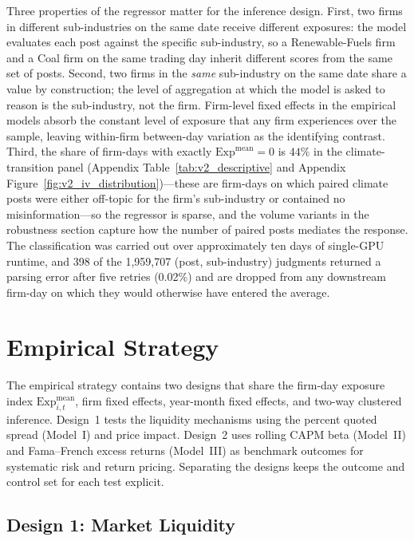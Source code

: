 \documentclass{article}
\theoremstyle{plain}
\begin{document}
Three properties of the regressor matter for the inference design. First, two firms in different sub-industries on the same date receive different exposures: the model evaluates each post against the specific sub-industry, so a Renewable-Fuels firm and a Coal firm on the same trading day inherit different scores from the same set of posts. Second, two firms in the \emph{same} sub-industry on the same date share a value by construction; the level of aggregation at which the model is asked to reason is the sub-industry, not the firm. Firm-level fixed effects in the empirical models absorb the constant level of exposure that any firm experiences over the sample, leaving within-firm between-day variation as the identifying contrast. Third, the share of firm-days with exactly $\mathrm{Exp}^{\text{mean}}=0$ is $44\%$ in the climate-transition panel (Appendix Table~\ref{tab:v2_descriptive} and Appendix Figure~\ref{fig:v2_iv_distribution})---these are firm-days on which paired climate posts were either off-topic for the firm's sub-industry or contained no misinformation---so the regressor is sparse, and the volume variants in the robustness section capture how the number of paired posts mediates the response. The classification was carried out over approximately ten days of single-GPU runtime, and 398 of the 1,959,707 (post, sub-industry) judgments returned a parsing error after five retries (0.02\%) and are dropped from any downstream firm-day on which they would otherwise have entered the average.

\section{Empirical Strategy}
\label{sec:model}

The empirical strategy contains two designs that share the firm-day exposure index $\mathrm{Exp}^{\text{mean}}_{i,t}$, firm fixed effects, year-month fixed effects, and two-way clustered inference. Design~1 tests the liquidity mechanisms using the percent quoted spread (Model~I) and price impact. Design~2 uses rolling CAPM beta (Model~II) and Fama--French excess returns (Model~III) as benchmark outcomes for systematic risk and return pricing. Separating the designs keeps the outcome and control set for each test explicit.

\subsection{Design 1: Market Liquidity}
\end{document}
